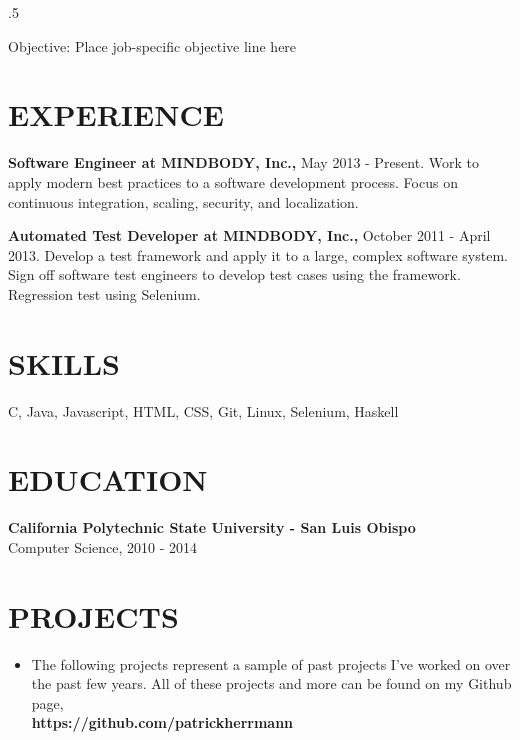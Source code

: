 \documentclass{res}
\begin{document}
\thispagestyle{empty} %
\address{375 Highland Blvd\\
San Luis Obispo, CA 93405\\
(707) 548 - 9187}


\begin{resume}
\vspace{0.1in}
\moveleft.5\sectionwidth\centerline{Objective: Place job-specific objective line here}
 
\section{EXPERIENCE}
\vspace{0.1in}
    {\bf Software Engineer at MINDBODY, Inc.,} May 2013 - Present.
    Work to apply modern best practices to a software development process.
    Focus on continuous integration, scaling, security, and localization.

 
    {\bf Automated Test Developer at MINDBODY, Inc.,} October 2011 - April 2013.
    Develop a test framework and apply it to a large, complex software
    system. Sign off software test engineers to develop test cases using the framework. Regression test using Selenium.

\section{SKILLS}
\vspace{0.1in}
    C, Java, Javascript, HTML, CSS, Git, Linux, Selenium, Haskell
    
\section{EDUCATION}
\vspace{0.1in}
 
    {\bf California Polytechnic State University - San Luis Obispo} \\
    Computer Science, 2010 - 2014
    
    
\section{PROJECTS}
\vspace{0.2in}
   \begin{itemize} %
      \item[] The following projects represent a sample of past projects I've worked
      on over the past few years. All of these projects and more can be found on my
       Github page, \\
      {\bf https://github.com/patrickherrmann}
      \end{itemize}


\end{resume}
\end{document}
